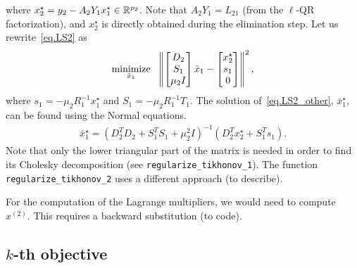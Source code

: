 \documentclass[12pt]{article}
\begin{document}
%
where $x_2^{\star} = y_2 - A_2Y_1x_1^{\star} \in {\mathbb{R}}^{p_2}$. Note that $A_2Y_1 = L_{21}$ (from the $\ell$-QR
factorization), and $x_2^{\star}$ is directly obtained during the elimination step. Let us
rewrite~\eqref{eq.LS2} as
%
\begin{align} \label{eq.LS2_other}
  \mathop{\mbox{minimize}}_{\bar{x}_1} \ \  \left\lVert\begin{bmatrix} D_2 \\ S_1 \\ \mu_2I \end{bmatrix}\bar{x}_1 -
    \begin{bmatrix} x_2^{\star} \\ s_1 \\ 0 \end{bmatrix}\right\rVert^2,
\end{align}
%
where $s_1 = -\mu_2R_1^{-1}x_1^{\star}$ and $S_1 = -\mu_2R_1^{-1}T_1$. The solution
of~\eqref{eq.LS2_other}, $\bar{x}_1^{\star}$, can be found using the Normal equations.
%
\begin{align*}
  \bar{x}_1^{\star} = (D_2^TD_2 + S_1^TS_1 + \mu_2^2I)^{-1} (D_2^Tx_2^{\star} + S_1^Ts_1).
\end{align*}
%
Note that only the lower triangular part of the matrix is needed in order to find its Cholesky
decomposition (see {\color{blue}\verb|regularize_tikhonov_1|}). The function
{\color{blue}\verb|regularize_tikhonov_2|} uses a different approach ({\color{red}to describe}).

For the computation of the Lagrange multipliers, we would need to compute $x^{(2)}$. This requires a
backward substitution ({\color{red}to code}).

\newpage

\subsection{$k$-th objective}
\end{document}
